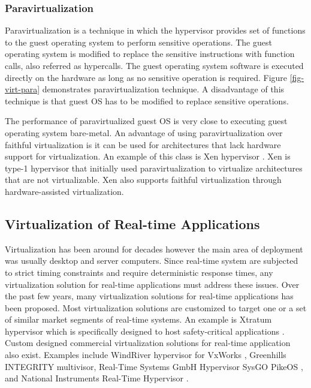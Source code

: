 \subsubsection{Paravirtualization}
Paravirtualization is a technique in which the hypervisor provides set of functions to the guest operating system to perform sensitive operations. 
The guest operating system is modified to replace the sensitive instructions with function calls, also referred as hypercalls.
The guest operating system software is executed directly on the hardware as long as no sensitive operation is required. 
Figure \ref{fig-virt-para} demonstrates paravirtualization technique.
A disadvantage of this technique is that guest OS has to be modified to replace sensitive operations.


The performance of paravirtualized guest OS is very close to executing guest operating system bare-metal.
An advantage of using paravirtualization over faithful virtualization is it can be used for architectures that lack hardware support for virtualization.
An example of this class is Xen hypervisor \cite{Barham:2003:XAV:1165389.945462}.
Xen is type-1 hypervisor that initially used paravirtualization to virtualize architectures that are not virtualizable. 
Xen also supports faithful virtualization through hardware-assisted virtualization.

\subsection{Virtualization of Real-time Applications}

Virtualization has been around for decades however the main area of deployment was usually desktop and server computers.
Since real-time system are subjected to strict timing constraints and require deterministic response times, any virtualization solution for real-time applications must address these issues.
Over the past few years, many virtualization solutions for real-time applications has been proposed.
Most virtualization solutions are customized to target one or a set of similar market segments of real-time systems. 
An example is Xtratum hypervisor which is specifically designed to host safety-critical applications \cite{Carrascosa:2014:XHR:2668138.2668142}.
Custom designed commercial virtualization solutions for real-time application also exist. 
Examples include WindRiver hypervisor for VxWorks \cite{bialowas2010achieving}, 
Greenhills INTEGRITY multivisor\cite{greenhills-multivisor}, 
Real-Time Systems GmbH Hypervisor \cite{realtime-systems-gmbh-hypervisor}
SysGO PikeOS \cite{kaiser2007pikeos}, 
and National Instruments Real-Time Hypervisor \cite{ni-realtime-hypervisor}.

